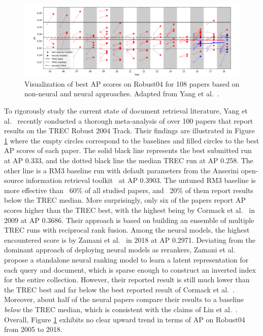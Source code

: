 \begin{figure}[b!]
\centering
  \includegraphics[width=6.5in]{neural_robust04.png}
\caption{Visualization of best AP scores on Robust04 for 108 papers based on non-neural and neural approaches. Adapted from Yang et al.~\cite{Yang_etal_SIGIR2019}.}
\label{fig:neural_robust04}
\end{figure}

To rigorously study the current state of document retrieval literature, Yang et al.~\cite{Yang_etal_SIGIR2019} recently conducted a thorough meta-analysis of over 100 papers that report results on the TREC Robust 2004 Track.
Their findings are illustrated in Figure \ref{fig:neural_robust04} where the empty circles correspond to the baselines and filled circles to the best AP scores of each paper.
The solid black line represents the best submitted run at AP 0.333, and the dotted black line the median TREC run at AP 0.258.
The other line is a RM3 baseline run with default parameters from the Anserini open-source information retrieval toolkit~\cite{Yang:2018:ARR:3289400.3239571} at AP 0.3903.
The untuned RM3 baseline is more effective than ~60\% of all studied papers, and ~20\% of them report results below the TREC median.
More surprisingly, only six of the papers report AP scores higher than the TREC best, with the highest being by Cormack et al.~\cite{Cormack:2009:RRF:1571941.1572114} in 2009 at AP 0.3686.
Their approach is based on building an ensemble of multiple TREC runs with reciprocal rank fusion.
Among the neural models, the highest encountered score is by Zamani et al.~\cite{zamani2018neural} in 2018 at AP 0.2971.
Deviating from the dominant approach of deploying neural models as rerankers, Zamani et al.~\cite{zamani2018neural} propose a standalone neural ranking model to learn a latent representation for each query and document, which is sparse enough to construct an inverted index for the entire collection.
However, their reported result is still much lower than the TREC best and far below the best reported result of Cormack et al.~\cite{Cormack:2009:RRF:1571941.1572114}.
Moreover, about half of the neural papers compare their results to a baseline \textit{below} the TREC median, which is consistent with the claims of Lin et al.~\cite{lin2019neural}.
Overall, Figure \ref{fig:neural_robust04} exhibits no clear upward trend in terms of AP on Robust04 from 2005 to 2018.

